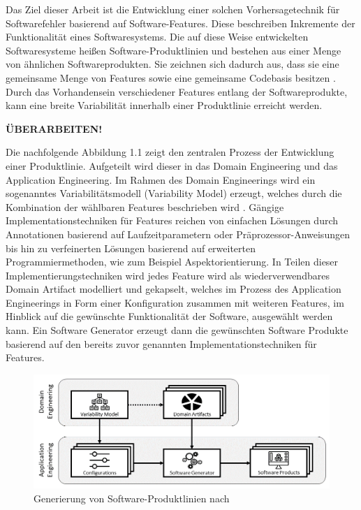 Das Ziel dieser Arbeit ist die Entwicklung einer solchen Vorhersagetechnik für Softwarefehler basierend auf Software-Features. Diese beschreiben Inkremente der Funktionalität eines Softwaresystems. Die auf diese Weise entwickelten Softwaresysteme heißen Software-Produktlinien und bestehen aus einer Menge von ähnlichen Softwareprodukten. Sie zeichnen sich dadurch aus, dass sie eine gemeinsame Menge von Features sowie eine gemeinsame Codebasis besitzen \cite{Thuem2014}. Durch das Vorhandensein verschiedener Features entlang der Softwareprodukte, kann eine breite Variabilität innerhalb einer Produktlinie erreicht werden. 

\textbf{ÜBERARBEITEN!}

Die nachfolgende Abbildung 1.1 zeigt den zentralen Prozess der Entwicklung einer Produktlinie. Aufgeteilt wird dieser in das Domain Engineering und das Application Engineering. Im Rahmen des Domain Engineerings wird ein sogenanntes Variabilitätsmodell (Variability Model) erzeugt, welches durch die Kombination der wählbaren Features beschrieben wird \cite{Apel2013}. Gängige Implementationstechniken für Features reichen von einfachen Lösungen durch Annotationen basierend auf Laufzeitparametern oder Präprozessor-Anweisungen bis hin zu verfeinerten Lösungen basierend auf erweiterten Programmiermethoden, wie zum Beispiel Aspektorientierung. In Teilen dieser Implementierungstechniken wird jedes Feature wird als wiederverwendbares Domain Artifact modelliert und gekapselt, welches im Prozess des Application Engineerings in Form einer Konfiguration zusammen mit weiteren Features, im Hinblick auf die gewünschte Funktionalität der Software, ausgewählt werden kann. Ein Software Generator erzeugt dann die gewünschten Software Produkte basierend auf den bereits zuvor genannten Implementationstechniken für Features.

\begin{figure}[H]
    \centering
    \includegraphics[width=\textwidth]{images/SPL}
    \caption{Generierung von Software-Produktlinien nach \cite{Thuem2014}\label{fig:spl}}
\end{figure}
 
